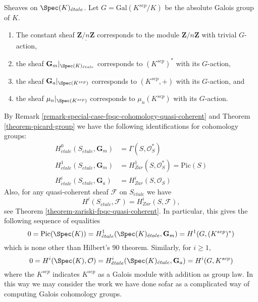 \begin{example}
\label{example-sheaves-point}
Sheaves on $\Spec(K)_{\acute{e}tale}$.
Let $G = \text{Gal}(K^{sep}/K)$ be the absolute Galois group of $K$.
\begin{enumerate}
\item The constant sheaf $\underline{\mathbf{Z}/n\mathbf{Z}}$ corresponds to
the module $\mathbf{Z}/n\mathbf{Z}$ with trivial $G$-action,
\item the sheaf $\mathbf{G}_m|_{\Spec(K)_{\acute{e}tale}}$ corresponds to
$(K^{sep})^*$ with its $G$-action,
\item the sheaf $\mathbf{G}_a|_{\Spec(K^{sep})}$ corresponds to
$(K^{sep}, +)$ with its $G$-action, and
\item the sheaf $\mu_n|_{\Spec(K^{sep})}$ corresponds to
$\mu_n(K^{sep})$ with its $G$-action.
\end{enumerate}
By
Remark \ref{remark-special-case-fpqc-cohomology-quasi-coherent}
and
Theorem \ref{theorem-picard-group}
we have the following identifications for cohomology groups:
\begin{align*}
H_{\acute{e}tale}^0(S_{\acute{e}tale}, \mathbf{G}_m) & =
\Gamma(S, \mathcal{O}_S^*) \\
H_{\acute{e}tale}^1(S_{\acute{e}tale}, \mathbf{G}_m) & =
H_{Zar}^1(S, \mathcal{O}_S^*) = \text{Pic}(S) \\
H_{\acute{e}tale}^i(S_{\acute{e}tale}, \mathbf{G}_a) & =
H_{Zar}^i(S, \mathcal{O}_S)
\end{align*}
Also, for any quasi-coherent sheaf $\mathcal{F}$ on $S_{\acute{e}tale}$ we have
$$
H^i(S_{\acute{e}tale}, \mathcal{F}) = H_{Zar}^i(S, \mathcal{F}),
$$
see
Theorem \ref{theorem-zariski-fpqc-quasi-coherent}.
In particular, this gives the following sequence of equalities
$$
0 =
\text{Pic}(\Spec(K)) =
H_{\acute{e}tale}^1(\Spec(K)_{\acute{e}tale}, \mathbf{G}_m) =
H^1(G, (K^{sep})^*)
$$
which is none other than Hilbert's 90 theorem. Similarly, for $i \geq 1$,
$$
0 = H^i(\Spec(K), \mathcal{O})
= H_{\acute{e}tale}^i(\Spec(K)_{\acute{e}tale}, \mathbf{G}_a)
= H^i(G, K^{sep})
$$
where the $K^{sep}$ indicates $K^{sep}$ as a Galois module with addition
as group law. In this way we may consider the work we have done sofar as
a complicated way of computing Galois cohomology groups.
\end{example}











